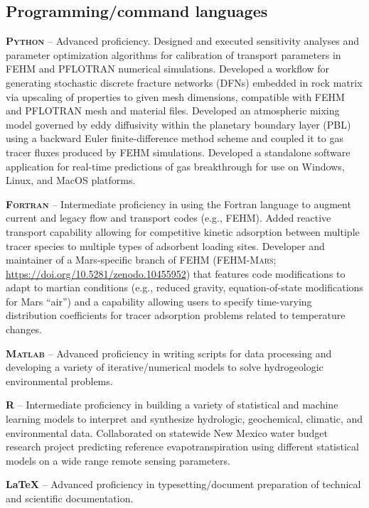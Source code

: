 \documentclass[11pt, letterpaper]{article}
\begin{document}
\subsection*{Programming/command languages}
\noindent
\textbf{\textsc{Python}} -- Advanced proficiency. Designed and executed
sensitivity analyses and parameter optimization algorithms for calibration of transport
parameters in FEHM and PFLOTRAN numerical simulations. Developed a workflow for
generating stochastic discrete fracture networks (DFNs) embedded in rock matrix
via upscaling of properties to given mesh dimensions, compatible with FEHM and
PFLOTRAN mesh and material files. Developed an atmospheric mixing model
governed by eddy diffusivity within the planetary boundary layer (PBL) using a
backward Euler finite-difference method scheme and coupled it to gas tracer
fluxes produced by FEHM simulations. Developed a standalone software
application for real-time predictions of gas breakthrough for use on Windows,
Linux, and MacOS platforms.

\textbf{\textsc{Fortran}} -- Intermediate proficiency in using the Fortran
language to augment current and legacy flow and transport codes (e.g.,
\textsc{FEHM}). Added reactive transport capability allowing for competitive
kinetic adsorption between multiple tracer species to multiple types of
adsorbent loading sites.  Developer and maintainer of a Mars-specific branch of
\textsc{FEHM} (\textsc{FEHM-Mars};
\href{https://doi.org/10.5281/zenodo.10455952}{https://doi.org/10.5281/zenodo.10455952})
that features code modifications to adapt to martian conditions (e.g., reduced
gravity, equation-of-state modifications for Mars ``air'') and a capability
allowing users to specify time-varying distribution coefficients for tracer
adsorption problems related to temperature changes.

\textbf{\textsc{Matlab}} -- Advanced proficiency in writing scripts for data
processing and developing a variety of iterative/numerical models to solve
hydrogeologic environmental problems.

\textbf{\textsc{R}} -- Intermediate proficiency in building a variety of
statistical and machine learning models to interpret and synthesize hydrologic,
geochemical, climatic, and environmental data. Collaborated on statewide New
Mexico water budget research project predicting reference evapotranspiration
using different statistical models on a wide range remote sensing parameters.

\textbf{\LaTeX} -- Advanced proficiency in typesetting/document preparation of
technical and scientific documentation.
\end{document}
